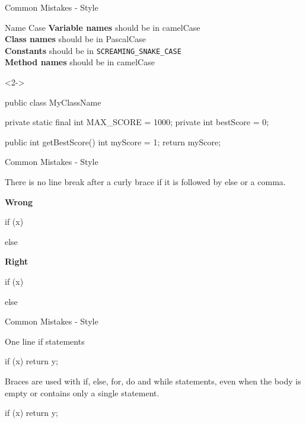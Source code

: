 \documentclass[12]{beamer}
\begin{document}
\begin{frame}[t, fragile]{Common Mistakes - Style} \vspace{4pt}

\begin{block}{Name Case}
\textbf{Variable names} should be in camelCase\\
\textbf{Class names} should be in PascalCase\\
\textbf{Constants} should be in \verb|SCREAMING_SNAKE_CASE|\\
\textbf{Method names} should be in camelCase\\[10pt]
\end{block}

\begin{onlyenv}<2->
\begin{java}
public class MyClassName {
	private static final int MAX_SCORE = 1000;
	private int bestScore = 0;

	public int getBestScore() {
		int myScore = 1;
		return myScore;
	}
}
\end{java}
\end{onlyenv}
\end{frame}

\begin{frame}[t, fragile]{Common Mistakes - Style} \vspace{4pt}

There is no line break after a curly brace if it is followed
by else or a comma.

\textbf{Wrong}
\begin{java}
if (x) {
  
}
else {
  
}
\end{java}

\textbf{Right}
\begin{java}
if (x) {
  
} else {
  
}
\end{java}

\end{frame}

\begin{frame}[t, fragile]{Common Mistakes - Style} \vspace{4pt}

One line if statements

\begin{java}
if (x) { return y; }
\end{java}

Braces are used with if, else, for, do and while statements,
even when the body is empty or contains only a single statement.

\begin{java}
if (x) return y;
\end{java}

\end{frame}
\end{document}
